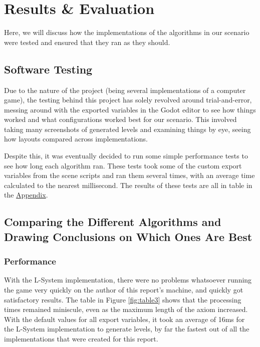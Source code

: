 \chapter{Results \& Evaluation} \label{Evaluation}

Here, we will discuss how the implementations of the algorithms in our scenario were tested and ensured that they ran as they should.

\section{Software Testing}

Due to the nature of the project (being several implementations of a computer game), the testing behind this project has solely revolved around trial-and-error, messing around with the exported variables in the Godot editor to see how things worked and what configurations worked best for our scenario. This involved taking many screenshots of generated levels and examining things by eye, seeing how layouts compared across implementations.

Despite this, it was eventually decided to run some simple performance tests to see how long each algorithm ran. These tests took some of the custom export variables from the scene scripts and ran them several times, with an average time calculated to the nearest millisecond. The results of these tests are all in table in the \hyperref[Appendix]{Appendix}.

\section{Comparing the Different Algorithms and Drawing Conclusions on Which Ones Are Best}

\subsection{Performance}

With the L-System implementation, there were no problems whatsoever running the game very quickly on the author of this report's machine, and quickly got satisfactory results. The table in Figure \ref{fig:table3} shows that the processing times remained miniscule, even as the maximum length of the axiom increased. With the default values for all export variables, it took an average of 16ms for the L-System implementation to generate levels, by far the fastest out of all the implementations that were created for this report.

